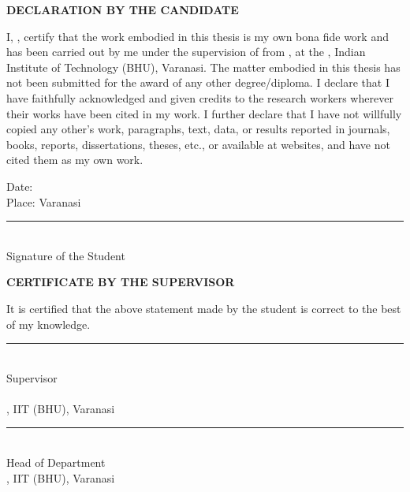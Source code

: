 {}
\thispagestyle{plain}
\begin{singlespace}

\vspace*{0.2cm}
\begin{center}
  {\large\bfseries DECLARATION BY THE CANDIDATE}
\end{center}
\vspace{0.5cm}

I, \textbf{\thesisauthor}, certify that the work embodied in this thesis is
my own bona fide work and has been carried out by me under the supervision
of \textbf{\thesisguide} from \thesisperiod, at the \thesisdepartment,
Indian Institute of Technology (BHU), Varanasi. The matter embodied in this
thesis has not been submitted for the award of any other degree/diploma. I
declare that I have faithfully acknowledged and given credits to the
research workers wherever their works have been cited in my work. I further
declare that I have not willfully copied any other's work, paragraphs,
text, data, or results reported in journals, books, reports, dissertations,
theses, etc., or available at websites, and have not cited them as my own
work.

\vspace{1.0cm}
\noindent
Date:\\[0.2cm]
Place: Varanasi
\hfill
\begin{minipage}{0.45\textwidth}
  \centering
  \rule{5cm}{0.4pt}\\
  Signature of the Student\\
  \textbf{\thesisauthor}
\end{minipage}

\vspace{1.0cm}
\begin{center}
  {\large\bfseries CERTIFICATE BY THE SUPERVISOR}
\end{center}
\vspace{0.4cm}

It is certified that the above statement made by the student is correct to
the best of my knowledge.

\vspace{1.2cm}
\begin{center}
  \rule{5cm}{0.4pt}\\
  Supervisor\\
  \textbf{\thesisguide}\\
  \thesisdepartment, IIT (BHU), Varanasi
\end{center}

\vspace{1.0cm}
\begin{center}
  \rule{5cm}{0.4pt}\\
  Head of Department\\
  \thesisdepartment, IIT (BHU), Varanasi
\end{center}

\end{singlespace}
\clearpage
